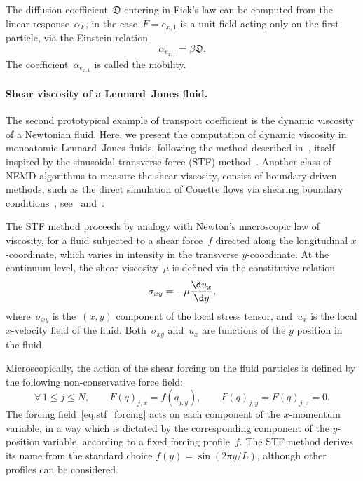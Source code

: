 The diffusion coefficient~$\mathfrak{D}$ entering in Fick's law can be computed from the linear response~$\alpha_F$, in the case~$F=e_{x,1}$ is a unit field acting only on the first particle, via the Einstein relation~\cite{rodenhausen1989}
\begin{equation}
    \label{eq:einstein_relation}
    \alpha_{e_{x,1}} = \beta\mathfrak{D}.
\end{equation}
The coefficient~$\alpha_{e_{x,1}}$ is called the mobility.
\paragraph{Shear viscosity of a Lennard--Jones fluid.}
The second prototypical example of transport coefficient is the dynamic viscosity of a Newtonian fluid. Here, we present the computation of dynamic viscosity in monoatomic Lennard--Jones fluids, following the method described in~\cite{js12}, itself inspired by the sinusoidal transverse force (STF) method~\cite{gms73}. Another class of NEMD algorithms to measure the shear viscosity, consist of boundary-driven methods, such as the direct simulation of Couette flows via shearing boundary conditions~\cite{le72}, see~\cite[Section 6.3]{evans_morriss_2007} and~\cite[Section 9.3]{todd_daivis_2017}.

The STF method proceeds by analogy with Newton's macroscopic law of viscosity, for a fluid subjected to a shear force~$f$ directed along the longitudinal $x$-coordinate, which varies in intensity in the transverse $y$-coordinate. At the continuum level, the shear viscosity~$\mu$ is defined via the constitutive relation
\begin{equation}
\label{eq:newton_equation}
    \sigma_{xy} = -\mu\frac{\d u_x}{\d y},
\end{equation}
where~$\sigma_{xy}$ is the~$(x,y)$ component of the local stress tensor, and~$u_x$ is the local $x$-velocity field of the fluid. Both~$\sigma_{xy}$ and~$u_x$ are functions of the $y$ position in the fluid.

Microscopically, the action of the shear forcing on the fluid particles is defined by the following non-conservative force field:
\begin{equation}
\label{eq:stf_forcing}
    \forall\,1\leq j\leq N,\qquad F(q)_{j,x} = f(q_{j,y}),\qquad F(q)_{j,y}=F(q)_{j,z}=0.
\end{equation}
The forcing field~\eqref{eq:stf_forcing} acts on each component of the $x$-momentum variable, in a way which is dictated by the corresponding component of the $y$-position variable, according to a fixed forcing profile~$f$. The STF method derives its name from the standard choice $f(y) = \sin(2\pi y/L)$, although other profiles can be considered.

